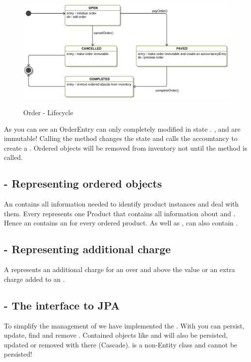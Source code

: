 \begin{figure}[ht]
	\centering
  \includegraphics[width=1.0\textwidth]{images/Order_StateMachine.eps}
	\label{order_statemachine}
	\caption{Order - Lifecycle}
\end{figure}  

As you can see an OrderEntry can only completely modified in state . ,  and   are immutable!  Calling the  method changes the state and calls the accountancy to create a . Ordered objects will be removed from inventory not until the  method is called.  

\subsection{ - Representing ordered objects}
An  contains all information needed to identify product instances and deal with them. Every  represents one Product that contains all information about  and . Hence an  contains an  for every ordered product. As well as ,  can also contain .

\subsection{ - Representing additional charge}
A  represents an additional charge for an  over and above the  value or an extra charge added to an .

\subsection{ - The interface to JPA}
To simplify the management of  we have implemented the . With  you can persist, update, find and remove . Contained objects like  and  will also be persisted, updated or removed with there  (Cascade).
 is a non-Entity class and cannot be persisted!

